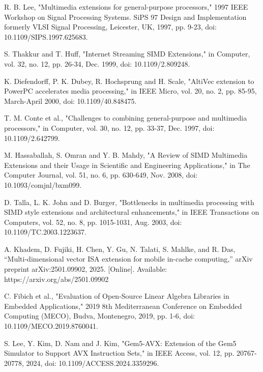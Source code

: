 \documentclass[conference]{IEEEtran}
\begin{document}
\begin{thebibliography}{00}
 R. B. Lee, "Multimedia extensions for general-purpose processors," 1997 IEEE Workshop on Signal Processing Systems. SiPS 97 Design and Implementation formerly VLSI Signal Processing, Leicester, UK, 1997, pp. 9-23, doi: 10.1109/SIPS.1997.625683.

 S. Thakkur and T. Huff, "Internet Streaming SIMD Extensions," in Computer, vol. 32, no. 12, pp. 26-34, Dec. 1999, doi: 10.1109/2.809248.

 K. Diefendorff, P. K. Dubey, R. Hochsprung and H. Scale, "AltiVec extension to PowerPC accelerates media processing," in IEEE Micro, vol. 20, no. 2, pp. 85-95, March-April 2000, doi: 10.1109/40.848475.

 T. M. Conte et al., "Challenges to combining general-purpose and multimedia processors," in Computer, vol. 30, no. 12, pp. 33-37, Dec. 1997, doi: 10.1109/2.642799.

 M. Hassaballah, S. Omran and Y. B. Mahdy, "A Review of SIMD Multimedia Extensions and their Usage in Scientific and Engineering Applications," in The Computer Journal, vol. 51, no. 6, pp. 630-649, Nov. 2008, doi: 10.1093/comjnl/bxm099.

 D. Talla, L. K. John and D. Burger, "Bottlenecks in multimedia processing with SIMD style extensions and architectural enhancements," in IEEE Transactions on Computers, vol. 52, no. 8, pp. 1015-1031, Aug. 2003, doi: 10.1109/TC.2003.1223637.


 A. Khadem, D. Fujiki, H. Chen, Y. Gu, N. Talati, S. Mahlke, and R. Das, “Multi-dimensional vector ISA extension for mobile in-cache computing,” arXiv preprint arXiv:2501.09902, 2025. [Online]. Available: https://arxiv.org/abs/2501.09902

 C. Fibich et al., "Evaluation of Open-Source Linear Algebra Libraries in Embedded Applications," 2019 8th Mediterranean Conference on Embedded Computing (MECO), Budva, Montenegro, 2019, pp. 1-6, doi: 10.1109/MECO.2019.8760041.

 S. Lee, Y. Kim, D. Nam and J. Kim, "Gem5-AVX: Extension of the Gem5 Simulator to Support AVX Instruction Sets," in IEEE Access, vol. 12, pp. 20767-20778, 2024, doi: 10.1109/ACCESS.2024.3359296.



\end{thebibliography}
\end{document}
